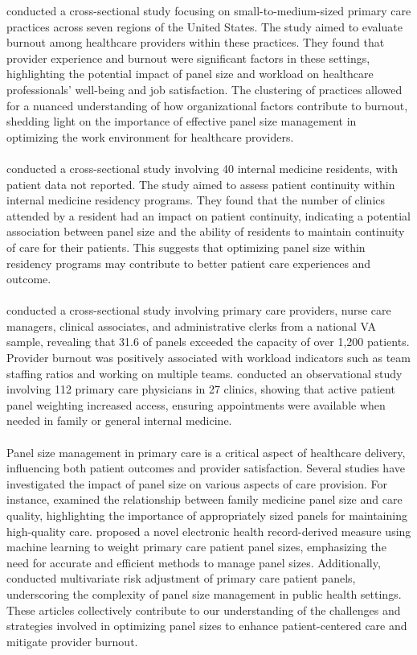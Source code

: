 \documentclass[11pt]{article}
\theoremstyle{definition}
\begin{document}
\cite{edwards2018} conducted a cross-sectional study focusing on small-to-medium-sized primary care practices across seven regions of the United States. The study aimed to evaluate burnout among healthcare providers within these practices. They found that provider experience and burnout were significant factors in these settings, highlighting the potential impact of panel size and workload on healthcare professionals' well-being and job satisfaction. The clustering of practices allowed for a nuanced understanding of how organizational factors contribute to burnout, shedding light on the importance of effective panel size management in optimizing the work environment for healthcare providers.\\\\
\cite{francis2009effect} conducted a cross-sectional study involving 40 internal medicine residents, with patient data not reported. The study aimed to assess patient continuity within internal medicine residency programs. They found that the number of clinics attended by a resident had an impact on patient continuity, indicating a potential association between panel size and the ability of residents to maintain continuity of care for their patients. This suggests that optimizing panel size within residency programs may contribute to better patient care experiences and outcome.\\\\
\cite{Helfrich2017} conducted a cross-sectional study involving primary care providers, nurse care managers, clinical associates, and administrative clerks from a national VA sample, revealing that 31.6 of panels exceeded the capacity of over 1,200 patients. Provider burnout was positively associated with workload indicators such as team staffing ratios and working on multiple teams. \cite{kamnetz2018} conducted an observational study involving 112 primary care physicians in 27 clinics, showing that active patient panel weighting increased access, ensuring appointments were available when needed in family or general internal medicine.\\\\
Panel size management in primary care is a critical aspect of healthcare delivery, influencing both patient outcomes and provider satisfaction. Several studies have investigated the impact of panel size on various aspects of care provision. For instance, \cite{Angstman2016} examined the relationship between family medicine panel size and care quality, highlighting the importance of appropriately sized panels for maintaining high-quality care. \cite{Rajkomar2016} proposed a novel electronic health record-derived measure using machine learning to weight primary care patient panel sizes, emphasizing the need for accurate and efficient methods to manage panel sizes. Additionally, \cite{Hirozawa2016} conducted multivariate risk adjustment of primary care patient panels, underscoring the complexity of panel size management in public health settings. These articles collectively contribute to our understanding of the challenges and strategies involved in optimizing panel sizes to enhance patient-centered care and mitigate provider burnout.\\\\
\end{document}
